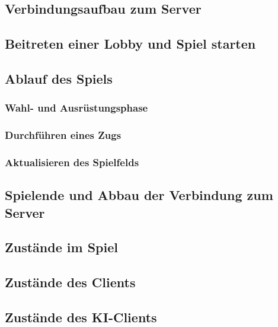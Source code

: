 \documentclass{uulm-assignment}
\begin{document}
\subsection{Verbindungsaufbau zum Server}


\subsection{Beitreten einer Lobby und Spiel starten}
\label{Sequ_Lobby}


\clearpage
\subsection{Ablauf des Spiels}
\subsubsection{Wahl- und Ausrüstungsphase}


\subsubsection{Durchführen eines Zugs}


\subsubsection{Aktualisieren des Spielfelds}


\subsection{Spielende und Abbau der Verbindung zum Server}
\label{Sequ_Winner}

\clearpage

\subsection{Zustände im Spiel}

\clearpage

\clearpage
\subsection{Zustände des Clients}


\subsection{Zustände des KI-Clients}

\end{document}
